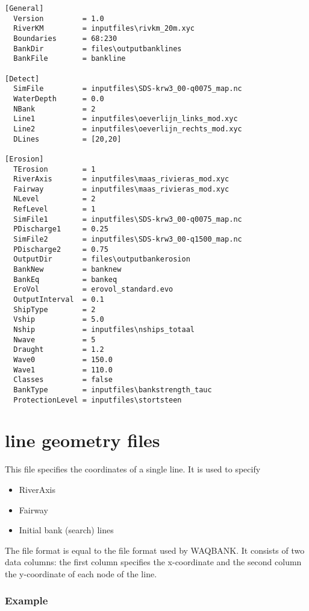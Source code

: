 \begin{Verbatim}
[General]
  Version         = 1.0
  RiverKM         = inputfiles\rivkm_20m.xyc
  Boundaries      = 68:230
  BankDir         = files\outputbanklines
  BankFile        = bankline

[Detect]
  SimFile         = inputfiles\SDS-krw3_00-q0075_map.nc
  WaterDepth      = 0.0
  NBank           = 2
  Line1           = inputfiles\oeverlijn_links_mod.xyc
  Line2           = inputfiles\oeverlijn_rechts_mod.xyc
  DLines          = [20,20]

[Erosion]
  TErosion        = 1
  RiverAxis       = inputfiles\maas_rivieras_mod.xyc
  Fairway         = inputfiles\maas_rivieras_mod.xyc
  NLevel          = 2
  RefLevel        = 1
  SimFile1        = inputfiles\SDS-krw3_00-q0075_map.nc
  PDischarge1     = 0.25
  SimFile2        = inputfiles\SDS-krw3_00-q1500_map.nc
  PDischarge2     = 0.75
  OutputDir       = files\outputbankerosion
  BankNew         = banknew
  BankEq          = bankeq
  EroVol          = erovol_standard.evo
  OutputInterval  = 0.1
  ShipType        = 2
  Vship           = 5.0
  Nship           = inputfiles\nships_totaal
  Nwave           = 5
  Draught         = 1.2
  Wave0           = 150.0
  Wave1           = 110.0
  Classes         = false
  BankType        = inputfiles\bankstrength_tauc
  ProtectionLevel = inputfiles\stortsteen
\end{Verbatim}

\section{line geometry files}

This file specifies the coordinates of a single line.
It is used to specify

\begin{itemize}
\item RiverAxis
\item Fairway
\item Initial bank (search) lines
\end{itemize}

The file format is equal to the file format used by WAQBANK.
It consists of two data columns: the first column specifies the x-coordinate and the second column the y-coordinate of each node of the line.

\subsubsection*{Example}

